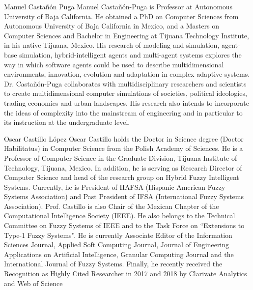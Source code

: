 \documentclass{ieeeaccess}
\begin{document}
\begin{IEEEbiography}{Manuel
Casta\~{n}\'{o}n Puga} Manuel Casta\~{n}\'{o}n-Puga is Professor at Autonomous University of
Baja California. He obtained a PhD on Computer Sciences from Autonomous
University of Baja California in Mexico, and a Masters on Computer Sciences and
Bachelor in Engineering at Tijuana Technology Institute, in his native Tijuana,
Mexico. His research of modeling and simulation, agent-base simulation,
hybrid-intelligent agents and multi-agent systems explores the way in which
software agents could be used to describe multidimensional environments,
innovation, evolution and adaptation in complex adaptive systems. Dr.
Casta\~{n}\'{o}n-Puga collaborates with multidisciplinary researchers and scientists to
create multidimensional computer simulations of societies, political ideologies,
trading economies and urban landscapes. His research also intends to incorporate
the ideas of complexity into the mainstream of engineering and in particular to
its instruction at the undergraduate level. \end{IEEEbiography}


\begin{IEEEbiography}{Oscar
Castillo L\'{o}pez} Oscar Castillo holds the Doctor in Science degree (Doctor
Habilitatus) in Computer Science from the Polish Academy of Sciences.
He is a Professor of Computer Science in the Graduate Division, Tijuana
Institute of Technology, Tijuana, Mexico. In addition, he is serving as Research
Director of Computer Science and head of the research group on Hybrid Fuzzy
Intelligent Systems. Currently, he is President of HAFSA (Hispanic American
Fuzzy Systems Association) and Past President of IFSA (International Fuzzy
Systems Association). Prof. Castillo is also Chair of the Mexican Chapter of the
Computational Intelligence Society (IEEE). He also belongs to the Technical
Committee on Fuzzy Systems of IEEE and to the Task Force on ``Extensions to
Type-1 Fuzzy Systems''. He is currently Associate Editor of the Information
Sciences Journal, Applied Soft Computing Journal, Journal of Engineering
Applications on Artificial Intelligence, Granular Computing Journal and the
International Journal of Fuzzy Systems. Finally, he recently received the Recognition as
Highly Cited Researcher in 2017 and 2018 by Clarivate Analytics and Web of
Science \end{IEEEbiography}




\EOD
\end{document}
